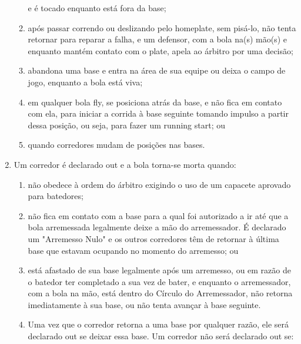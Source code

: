 \begin{enumerate}[label=(\alph*)]
\begin{enumerate}[label=\roman*.]
		e é tocado enquanto está fora da base;
		\item  após passar correndo ou deslizando pelo \gls{homeplate}, sem pisá-lo, não tenta retornar para reparar a falha, e um defensor, com a bola na(s) mão(s) e enquanto mantém contato com o \gls{plate}, apela ao árbitro por uma decisão;
		\item  abandona uma base e entra na área de sua equipe ou deixa o campo de jogo, enquanto a bola está viva;
		\item  em qualquer bola \gls{fly}, se posiciona atrás da base, e não fica em contato com ela, para iniciar a corrida à base seguinte tomando impulso a partir dessa posição, ou seja, para fazer um \gls{running start}; ou
		\item  quando corredores mudam de posições nas bases.
	\end{enumerate}
	\item  Um corredor é declarado \gls{out} e a bola torna-se morta quando:

	\begin{enumerate}[label=\roman*.]
		\item não obedece à ordem do árbitro exigindo o uso de um capacete aprovado para batedores;
		\item não fica em contato com a base para a qual foi autorizado a ir até que a bola arremessada legalmente deixe a mão do arremessador.
		É declarado um "Arremesso Nulo" e os outros corredores têm de retornar à última base que estavam ocupando no momento do arremesso; ou
		\item  está afastado de sua base legalmente após um arremesso, ou em razão de o batedor ter completado a sua vez de bater, e enquanto o arremessador, com a bola na mão, está dentro do Círculo do Arremessador, não retorna imediatamente à sua base, ou não tenta avançar à base seguinte.
		\item  Uma vez que o corredor retorna a uma base por qualquer razão, ele
		será declarado \gls{out} se deixar essa base. Um corredor não será
		declarado \gls{out} se:


\end{enumerate}
\end{enumerate}
